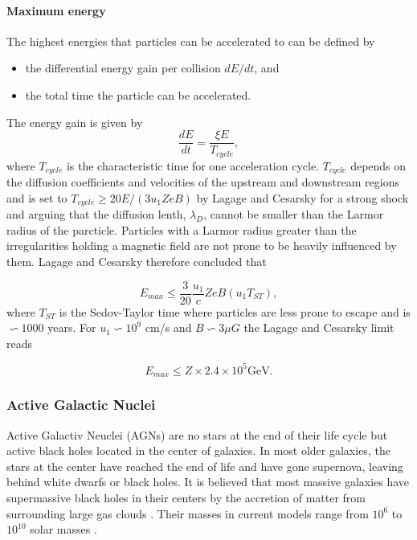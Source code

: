 \paragraph{Maximum energy}
\label{para:maxenergy}
The highest energies that particles can be accelerated to can be defined by

\begin{itemize}
\item the differential energy gain per collision $dE/dt$, and
\item the total time the particle can be accelerated.
\end{itemize}
\vspace{2mm}
\noindent The energy gain is given by
\begin{equation}
\frac{dE}{dt} = \frac{\xi E}{T_{cycle}},
\end{equation}
where $T_{cycle}$ is the characteristic time for one acceleration cycle. $T_{cycle}$ depends on the diffusion coefficients and velocities of the upstream and downstream regions and is set to $T_{cycle} \geq 20 E/(3 u_1 Z e B)$ by Lagage and Cesarsky \cite{Lagage:1983zz} for a strong shock and arguing that the diffusion lenth, $\lambda_D$, cannot be smaller than the Larmor radius of the parcticle. Particles with a Larmor radius greater than the irregularities holding a magnetic field are not prone to be heavily influenced by them. Lagage and Cesarsky therefore concluded that

\begin{equation}
E_{max} \leq \frac{3}{20} \frac{u_1}{c} Z e B (u_1 T_{ST}),
\end{equation}
where $T_{ST}$ is the Sedov-Taylor time where particles are less prone to escape and is $\backsim 1000$ years. For $u_1 \backsim 10^9$ cm/s \cite{stanev2010high}  and $B \backsim 3\mu G$ the Lagage and Cesarsky limit reads

\begin{equation}
E_{max} \leq Z \times 2.4 \times 10^5 \textrm{GeV}.
\end{equation}

\subsubsection{Active Galactic Nuclei}
\label{subsubsec:agn}
Active Galactiv Neuclei (AGNs) are no stars at the end of their life cycle but active black holes located in the center of galaxies. In most older galaxies, the stars at the center have reached the end of life and have gone supernova, leaving behind white dwarfs or black holes. It is believed that most massive galaxies have supermassive black holes in their centers by the accretion of matter from surrounding large gas clouds \cite{Urry:1995mg,Antonucci:1993sg}. Their masses in current models range from $10^6$ to $10^{10}$ solar masses \cite{Kazanas:2012sk}.


